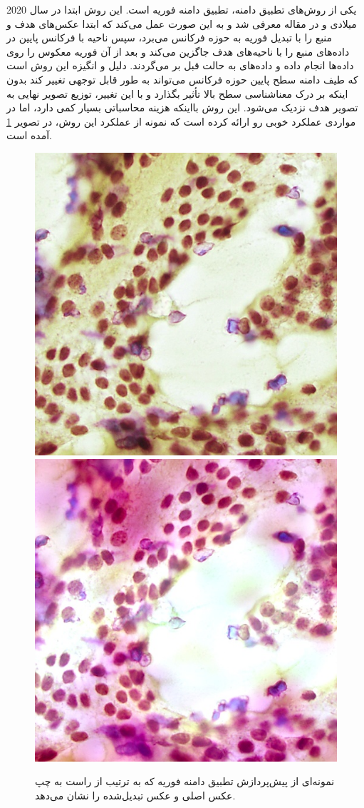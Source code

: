 یکی از روش‌های تطبیق دامنه، تطبیق دامنه فوریه است. این روش ابتدا در سال 2020 میلادی و در مقاله \cite{yang2020fda} معرفی شد و به این صورت عمل می‌کند که ابتدا عکس‌های هدف و منبع را با تبدیل فوریه به حوزه فرکانس می‌برد، سپس ناحیه با فرکانس پایین در داده‌های منبع را با ناحیه‌های هدف جاگزین می‌کند و بعد از آن فوریه معکوس را روی داده‌ها انجام داده و داده‌های به حالت قبل بر می‌گردند. دلیل و انگیزه این روش است که طیف دامنه سطح پایین حوزه فرکانس می‌تواند به طور قابل توجهی تغییر کند بدون اینکه بر درک معناشناسی سطح بالا تأثیر بگذارد و با این تغییر، توزیع تصویر نهایی به تصویر هدف نزدیک می‌شود.
این روش بااینکه هزینه محاسباتی بسیار کمی دارد، اما در مواردی عملکرد خوبی رو ارائه کرده است که نمونه از عملکرد این روش، در تصویر \ref{fda augmentation} آمده است.
\begin{figure}
    \begin{center}
        \includegraphics[width=0.48\linewidth]{figs/suggested_methods/subs/data_augmentation/fda_1054-original.jpeg}
        \includegraphics[width=0.48\linewidth]{figs/suggested_methods/subs/data_augmentation/fda_1054-transformed.jpeg}
    \end{center}
    \caption{نمونه‌ای از پیش‌پردازش تطبیق دامنه فوریه که به ترتیب از راست به چپ عکس اصلی و عکس تبدیل‌شده را نشان می‌دهد.}
    \label{fda augmentation}
\end{figure}

